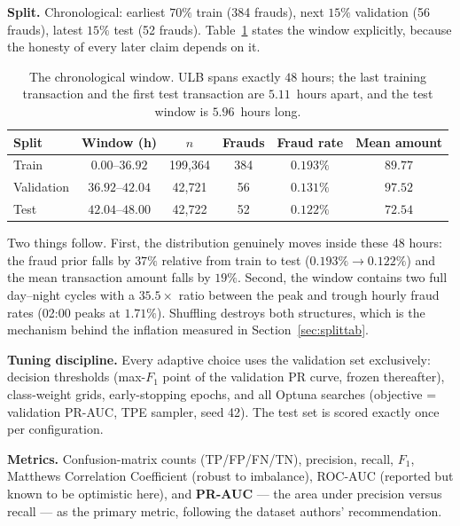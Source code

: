 \documentclass[11pt,a4paper]{article}
\begin{document}
\textbf{Split.} Chronological: earliest $70\%$ train (384 frauds), next $15\%$
validation (56 frauds), latest $15\%$ test (52 frauds). Table~\ref{tab:window} states the
window explicitly, because the honesty of every later claim depends on it.

\begin{table}[h]
      \centering\small
      \caption{The chronological window. ULB spans exactly $48$ hours; the last training
      transaction and the first test transaction are $5.11$~hours apart, and the test window is
      $5.96$~hours long.}
      \label{tab:window}
      \begin{tabular}{lccccc}
            \toprule
            Split & Window (h) & $n$ & Frauds & Fraud rate & Mean amount\\
            \midrule
            Train & $0.00$--$36.92$ & 199{,}364 & 384 & $0.193\%$ & $89.77$\\
            Validation & $36.92$--$42.04$ & 42{,}721 & 56 & $0.131\%$ & $97.52$\\
            Test & $42.04$--$48.00$ & 42{,}722 & 52 & $0.122\%$ & $72.54$\\
            \bottomrule
      \end{tabular}
\end{table}

Two things follow. First, the distribution genuinely moves inside these 48 hours: the fraud
prior falls by $37\%$ relative from train to test ($0.193\%\to0.122\%$) and the mean
transaction amount falls by $19\%$. Second, the window contains two full day--night cycles with
a $35.5\times$ ratio between the peak and trough hourly fraud rates (02:00 peaks at $1.71\%$).
Shuffling destroys both structures, which is the mechanism behind the inflation measured in
Section~\ref{sec:splittab}.

\textbf{Tuning discipline.} Every adaptive choice uses the validation set exclusively:
decision thresholds (max-$F_1$ point of the validation PR curve, frozen thereafter),
class-weight grids, early-stopping epochs, and all Optuna searches (objective =
validation PR-AUC, TPE sampler, seed 42). The test set is scored exactly once per
configuration.

\textbf{Metrics.} Confusion-matrix counts (TP/FP/FN/TN), precision, recall, $F_1$,
Matthews Correlation Coefficient (robust to imbalance), ROC-AUC (reported but known to be
optimistic here), and \textbf{PR-AUC} --- the area under precision versus recall --- as the
primary metric, following the dataset authors' recommendation.
\end{document}
